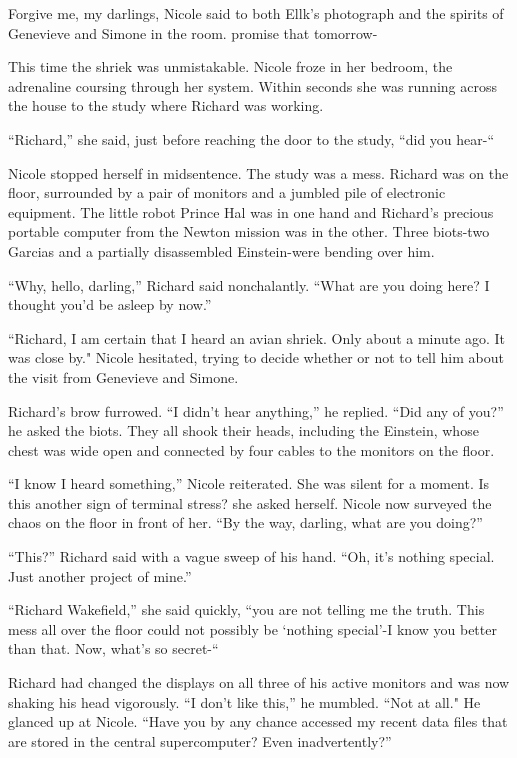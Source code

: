 \documentclass[]{article}
\begin{document}
{Forgive me, my darlings, Nicole said to both Ellk’s photograph and the spirits of Genevieve and Simone in the room.  promise that tomorrow-

This time the shriek was unmistakable.  Nicole froze in her bedroom, the adrenaline coursing through her system.  Within seconds she was running across the house to the study where Richard was working.

“Richard,” she said, just before reaching the door to the study, “did you hear-“

Nicole stopped herself in midsentence.  The study was a mess.  Richard was on the floor, surrounded by a pair of monitors and a jumbled pile of electronic equipment.  The little robot Prince Hal was in one hand and Richard’s precious portable computer from the Newton mission was in the other.  Three biots-two Garcias and a partially disassembled Einstein-were bending over him.

“Why, hello, darling,” Richard said nonchalantly.  “What are you doing here? I thought you’d be asleep by now.”

“Richard, I am certain that I heard an avian shriek.  Only about a minute ago.  It was close by."  Nicole hesitated, trying to decide whether or not to tell him about the visit from Genevieve and Simone.

Richard’s brow furrowed.  “I didn’t hear anything,” he replied.  “Did any of you?” he asked the biots.  They all shook their heads, including the Einstein, whose chest was wide open and connected by four cables to the monitors on the floor.

“I know I heard something,” Nicole reiterated.  She was silent for a moment.  Is this another sign of terminal stress? she asked herself.  Nicole now surveyed the chaos on the floor in front of her.  “By the way, darling, what are you doing?”

“This?” Richard said with a vague sweep of his hand.  “Oh, it’s nothing special.  Just another project of mine.”

“Richard Wakefield,” she said quickly, “you are not telling me the truth.  This mess all over the floor could not possibly be ‘nothing special’-I know you better than that.  Now, what’s so secret-“

Richard had changed the displays on all three of his active monitors and was now shaking his head vigorously.  “I don’t like this,” he mumbled.  “Not at all."  He glanced up at Nicole.  “Have you by any chance accessed my recent data files that are stored in the central supercomputer? Even inadvertently?”

}
\end{document}
